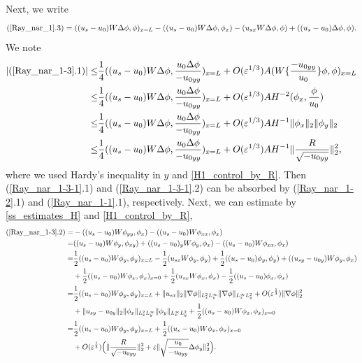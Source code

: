 \documentclass[reqno, 11pt]{amsart}
\theoremstyle{plain}
\theoremstyle{definition}
\theoremstyle{remark}
\numberwithin{equation}{section}
\begin{document}
Next, we write
\begin{equation}\label{Ray_nar_1-3}
(\ref{Ray_nar_1}.3) = ((u_s-u_0)W\Delta\phi,\phi)_{x=L}-((u_s-u_0)W\Delta
\phi,\phi_{x})-(u_{sx}W\Delta
\phi,\phi)+((u_s-u_0)\Delta\phi,\phi).
\end{equation}
We note
\begin{equation}\label{Ray_nar_1-3-1}
\begin{aligned}
|(\ref{Ray_nar_1-3}.1)|  \leq &\frac{1}{4}((u_s-u_0)W\Delta\phi,\frac{u_0\Delta\phi}{-u_{0yy}})_{x=L}
+O(\varepsilon^{1/3})A(W\{\frac{-u_{0yy}}{u_0}\}\phi, \phi)_{x=L}\\
\leq &\frac{1}{4}((u_s-u_0)W\Delta\phi,\frac{u_0\Delta\phi}{-u_{0yy}})_{x=L}
+O(\varepsilon^{1/3})AH^{-2}(\phi_x, \frac{\phi}{u_0})\\
\leq &\frac{1}{4}((u_s-u_0)W\Delta\phi,\frac{u_0\Delta\phi}{-u_{0yy}})_{x=L}
+O(\varepsilon^{1/3})AH^{-1}\|\phi_x\|_2\|\phi_y\|_2\\
\leq &\frac{1}{4}((u_s-u_0)W\Delta\phi,\frac{u_0\Delta\phi}{-u_{0yy}})_{x=L}
+O(\varepsilon^{1/3})AH^{-1} \|\frac{R}{\sqrt{-u_{0yy}}}\|_2^2,
\end{aligned}
\end{equation}
where we used Hardy's inequality in $y$ and \eqref{H1_control_by_R}. Then (\ref{Ray_nar_1-3-1}.1) and (\ref{Ray_nar_1-3-1}.2) can be absorbed by (\ref{Ray_nar_1-2}.1) and (\ref{Ray_nar_1-1}.1), respectively. Next, we can estimate by \eqref{ss_estimates_H} and \eqref{H1_control_by_R},
\begin{equation}\label{Ray_nar_1-3-2}
\begin{aligned}
(\ref{Ray_nar_1-3}.2)  =& -((u_s-u_0)W\phi_{yy},\phi_{x})-((u_s-u_0)W\phi_{xx}
,\phi_{x})\\
 =&((u_s-u_0)W\phi_{y},\phi_{xy}) + ((u_s-u_0)_y W\phi_{y},\phi_{x}) -((u_s-u_0)W\phi_{xx} ,\phi_{x})\\
=&\frac{1}{2}((u_s-u_0)W\phi_{y},\phi_{y})_{x=L} - \frac{1}{2}(u_{sx}W\phi_{y},\phi_{y}) + \frac{1}{2}((u_s-u_0)\phi_{y},\phi_{y})+ ((u_{sy}-u_{0y}) W\phi_{y},\phi_{x})\\
&+ \frac{1}{2}((u_s-u_0)W\phi_{x},\phi_{x})_{x=0} + \frac{1}{2}(u_{sx}W\phi_{x},\phi_{x}) - \frac{1}{2}((u_s-u_0)\phi_{x},\phi_{x})\\
=&\frac{1}{2}((u_s-u_0)W\phi_{y},\phi_{y})_{x=L}+ \|u_{sx}\|_2\|\nabla\phi\|_{L^2_xL^\infty_y}\|\nabla\phi\|_{L^\infty_xL^2_y} + O(\varepsilon^{\frac{1}{3}})\|\nabla\phi\|_2^2\\
& +\|u_{sy}-u_{0y}\|_2 \|  \phi_x\|_{L^2_xL^\infty_y} \|\phi_y\|_{L^\infty_xL^2_y}+ \frac{1}{2}((u_s-u_0)W\phi_{x},\phi_{x})_{x=0} \\
=& \frac{1}{2}((u_s-u_0)W\phi_{y},\phi_{y})_{x=L} + \frac
{1}{2}((u_s-u_0)W\phi_{x},\phi_{x})_{x=0}\\
&+ O(\varepsilon^{\frac{1}{3}})\Big(  \|\frac{R}{\sqrt{-u_{0yy}}}\|_2^2 + \varepsilon \| \sqrt{\frac{u_0}{-u_{0yy}}} \Delta \phi_y\|_2^2 \Big).
\end{aligned}
\end{equation}
\end{document}
